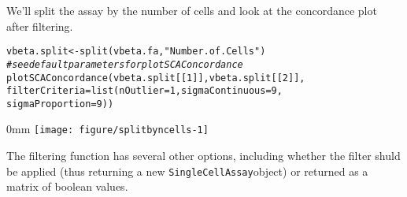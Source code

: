 \documentclass{article}\usepackage[]{graphicx}\usepackage[usenames,dvipsnames]{color}
\makeatletter
\def\maxwidth{ %
  \ifdim\Gin@nat@width>\linewidth
    \linewidth
  \else
    \Gin@nat@width
  \fi
}
\newcommand{\hlnum}[1]{\textcolor[rgb]{0.816,0.125,0.439}{#1}}%
\newcommand{\hlstr}[1]{\textcolor[rgb]{0.251,0.627,0.251}{#1}}%
\newcommand{\hlcom}[1]{\textcolor[rgb]{0.502,0.502,0.502}{\textit{#1}}}%
\newcommand{\hlstd}[1]{\textcolor[rgb]{0.251,0.251,0.251}{#1}}%
\newcommand{\hlkwb}[1]{\textcolor[rgb]{0,0,0}{#1}}%
\newcommand{\hlkwc}[1]{\textcolor[rgb]{0.251,0.251,0.251}{#1}}%
\newcommand{\hlkwd}[1]{\textcolor[rgb]{0.878,0.439,0.125}{#1}}%
\newenvironment{knitrout}{}{} %
\newcommand{\sca}{\texttt{SingleCellAssay}}
\makeatother
\begin{document}
We'll split the assay by the number of cells and look at the concordance plot after filtering. 
\begin{knitrout}
\color{fgcolor}\begin{kframe}
\begin{alltt}
\hlstd{vbeta.split}\hlkwb{<-}\hlkwd{split}\hlstd{(vbeta.fa,}\hlstr{"Number.of.Cells"}\hlstd{)}
\hlcom{#see default parameters for plotSCAConcordance}
\hlkwd{plotSCAConcordance}\hlstd{(vbeta.split[[}\hlnum{1}\hlstd{]],vbeta.split[[}\hlnum{2}\hlstd{]],}
                   \hlkwc{filterCriteria}\hlstd{=}\hlkwd{list}\hlstd{(}\hlkwc{nOutlier} \hlstd{=} \hlnum{1}\hlstd{,} \hlkwc{sigmaContinuous} \hlstd{=} \hlnum{9}\hlstd{,}
                       \hlkwc{sigmaProportion} \hlstd{=} \hlnum{9}\hlstd{))}
\end{alltt}


{\ttfamily\noindent\itshape\color{messagecolor}{\#\# Using primerid as id variables\\\#\# Using primerid as id variables\\\#\# Using primerid as id variables\\\#\# Using primerid as id variables}}

{\ttfamily\noindent\itshape\color{messagecolor}{\#\# Sum of Squares before Filtering: 14.89\\\#\#\ \ After filtering: 12.41\\\#\#\ \ Difference: 2.48}}\end{kframe}\begin{adjustwidth}{\fltoffset}{0mm}
\texttt{[image: figure/splitbyncells-1]} \end{adjustwidth}
\end{knitrout}

The filtering function has several other options, including whether the filter shuld be applied (thus returning a new \sca object) or returned as a matrix of boolean values.
\end{document}
